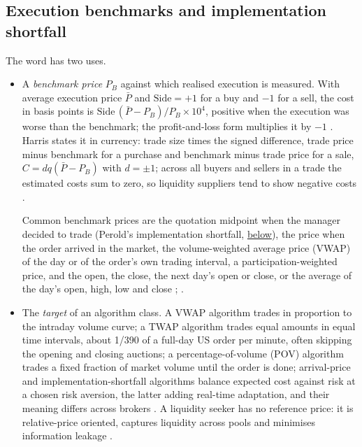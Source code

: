 \subsection{Execution benchmarks and implementation shortfall}

\begin{qfdefinition}\label{def:execution-benchmark}
 The word has two uses.
\begin{itemize}
\item A \emph{benchmark price} $P_B$ against which realised execution is measured. With average execution price $\bar P$ and $\mathrm{Side}=+1$ for a buy and $-1$ for a sell, the cost in basis points is $\mathrm{Side}\,(\bar P-P_B)/P_B\times10^4$, positive when the execution was worse than the benchmark; the profit-and-loss form multiplies it by $-1$ \citep[chap.~3, eqs.~(3.11)--(3.14), pp.~105--106]{s7-kissellscience}. Harris states it in currency: trade size times the signed difference, trade price minus benchmark for a purchase and benchmark minus trade price for a sale, $C=dq(\bar P-P_B)$ with $d=\pm1$; across all buyers and sellers in a trade the estimated costs sum to zero, so liquidity suppliers tend to show negative costs \citep[chap.~``Liquidity and Transaction Cost Measurement'', sec.~21.2, pp.~422--423]{alpha-harris}.

Common benchmark prices are the quotation midpoint when the manager decided to trade (Perold's implementation shortfall, \hyperref[def:implementation-shortfall]{below}), the price when the order arrived in the market, the volume-weighted average price (VWAP) of the day or of the order's own trading interval, a participation-weighted price, and the open, the close, the next day's open or close, or the average of the day's open, high, low and close \citep[chap.~``Liquidity and Transaction Cost Measurement'', pp.~424--426]{alpha-harris}; \citep[chap.~3, pp.~106--108]{s7-kissellscience}.
\item The \emph{target} of an algorithm class. A VWAP algorithm trades in proportion to the intraday volume curve; a TWAP algorithm trades equal amounts in equal time intervals, about 1/390 of a full-day US order per minute, often skipping the opening and closing auctions; a percentage-of-volume (POV) algorithm trades a fixed fraction of market volume until the order is done; arrival-price and implementation-shortfall algorithms balance expected cost against risk at a chosen risk aversion, the latter adding real-time adaptation, and their meaning differs across brokers \citep[chap.~1, pp.~16--18]{s7-kissellscience}. A liquidity seeker has no reference price: it is relative-price oriented, captures liquidity across pools and minimises information leakage \citep[sec.~3.4.1, Table~3.2, p.~230]{alpha-laruelle}.
\end{itemize}


\end{qfdefinition}
